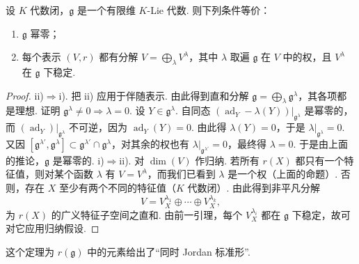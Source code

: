 \begin{numpara}[借助表示论的刻画]
\begin{theorem*}
设 $K$ 代数闭，$\mathfrak{g}$ 是一个有限维 $K$-Lie 代数. 则下列条件等价：
\begin{enumerate}[label=\roman*)]
\item $\mathfrak{g}$ 幂零；
\item 每个表示 $(V, r)$ 都有分解 $V = \bigoplus_{\lambda} V^{\lambda}$，其中 $\lambda$ 取遍 $\mathfrak{g}$ 在 $V$ 中的权，且 $V^{\lambda}$ 在 $\mathfrak{g}$ 下稳定.
\end{enumerate}
\end{theorem*}
\begin{proof}
ii)$\Rightarrow$i). 把 ii) 应用于伴随表示. 由此得到直和分解 $\mathfrak{g} = \bigoplus_{\lambda} \mathfrak{g}^{\lambda}$，其各项都是理想. 证明 $\mathfrak{g}^{\lambda} \neq 0 \Rightarrow \lambda = 0$. 设 $Y \in \mathfrak{g}^{\lambda}$. 自同态 $(\operatorname{ad}_Y - \lambda(Y))|_{\mathfrak{g}^{\lambda}}$ 是幂零的，而 $(\operatorname{ad}_Y)|_{\mathfrak{g}^{\lambda}}$ 不可逆，因为 $\operatorname{ad}_Y(Y) = 0$. 由此得 $\lambda(Y) = 0$，于是 $\lambda|_{\mathfrak{g}^{\lambda}} = 0$. 又因 $[\mathfrak{g}^{\lambda'}, \mathfrak{g}^{\lambda}] \subset \mathfrak{g}^{\lambda'} \cap \mathfrak{g}^{\lambda}$，对其余的权也有 $\lambda|_{\mathfrak{g}^{\lambda'}} = 0$，最终得 $\lambda = 0$. 于是由上面的推论，$\mathfrak{g}$ 是幂零的.
i)$\Rightarrow$ii). 对 $\dim(V)$ 作归纳. 若所有 $r(X)$ 都只有一个特征值，则对某个函数 $\lambda$ 有 $V = V^{\lambda}$，而我们已看到 $\lambda$ 是一个权（上面的命题）. 否则，存在 $X$ 至少有两个不同的特征值（$K$ 代数闭）. 由此得到非平凡分解
\[V = V^{\lambda_1}_X \oplus \cdots \oplus V^{\lambda_k}_X,\]
为 $r(X)$ 的广义特征子空间之直和. 由前一引理，每个 $V^{\lambda_i}_X$ 都在 $\mathfrak{g}$ 下稳定，故可对它应用归纳假设.
\end{proof}
\begin{remark*}
这个定理为 $r(\mathfrak{g})$ 中的元素给出了``同时 Jordan 标准形''.
\end{remark*}
\end{numpara}

